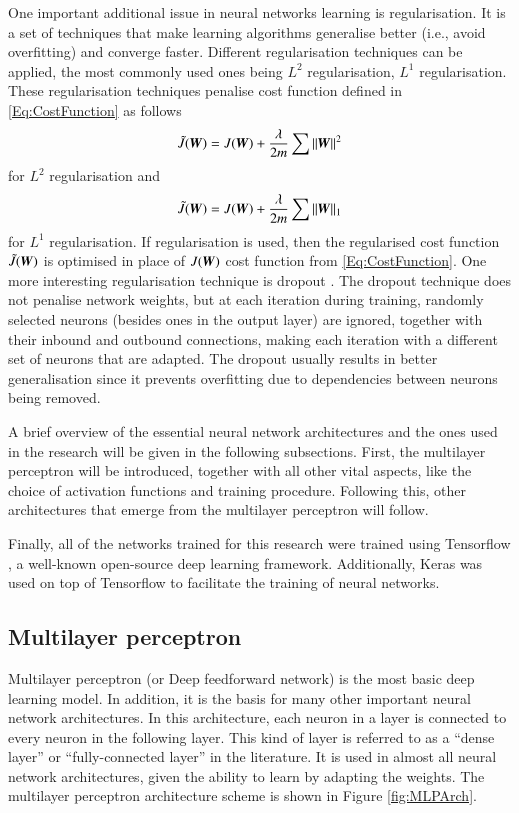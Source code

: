 One important additional issue in neural networks learning is regularisation. It is a set of techniques that make learning algorithms generalise better (i.e., avoid overfitting) and converge faster. Different regularisation techniques can be applied, the most commonly used ones being $L^2$ regularisation, $L^1$ regularisation. These regularisation techniques penalise cost function defined in \cref{Eq:CostFunction} as follows
\[
    \tilde{J}({\bm{W}})=J({\bm{W}})+\frac{\lambda}{2m}\sum\|{\bm{W}}\|^2
\]
for $L^2$ regularisation and
\[
    \tilde{J}({\bm{W}})=J({\bm{W}})+\frac{\lambda}{2m}\sum\|{\bm{W}}\|_1
\]
for $L^1$ regularisation. If regularisation is used, then the regularised cost function $\tilde{J}({\bm{W}})$ is optimised in place of $J({\bm{W}})$ cost function from \cref{Eq:CostFunction}. One more interesting regularisation technique is dropout \cite{Srivastava2014}. The dropout technique does not penalise network weights, but at each iteration during training, randomly selected neurons (besides ones in the output layer) are ignored, together with their inbound and outbound connections, making each iteration with a different set of neurons that are adapted. The dropout usually results in better generalisation since it prevents overfitting due to dependencies between neurons being removed.

A brief overview of the essential neural network architectures and the ones used in the research will be given in the following subsections. First, the multilayer perceptron will be introduced, together with all other vital aspects, like the choice of activation functions and training procedure. Following this, other architectures that emerge from the multilayer perceptron will follow. 

Finally, all of the networks trained for this research were trained using Tensorflow \cite{Abadi2015}, a well-known open-source deep learning framework. Additionally, Keras \cite{Chollet2015} was used on top of Tensorflow to facilitate the training of neural networks.

\subsection{Multilayer perceptron}
\label{sec:MLP}

Multilayer perceptron (or Deep feedforward network) is the most basic deep learning model. In addition, it is the basis for many other important neural network architectures. In this architecture, each neuron in a layer is connected to every neuron in the following layer. This kind of layer is referred to as a ``dense layer'' or ``fully-connected layer'' in the literature. It is used in almost all neural network architectures, given the ability to learn by adapting the weights. The multilayer perceptron architecture scheme is shown in Figure \ref{fig:MLPArch}.

